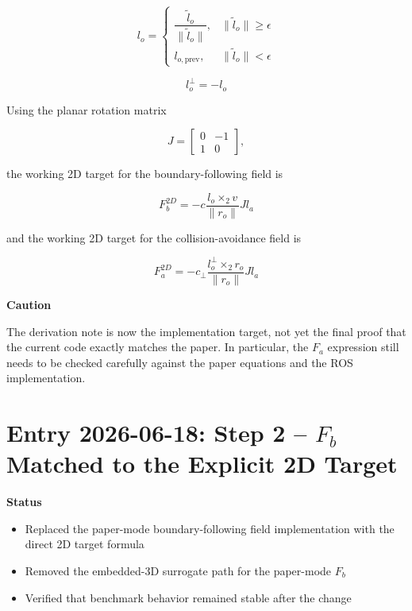 \documentclass[11pt]{article}
\begin{document}
\begin{equation}
l_o =
\begin{cases}
\dfrac{\tilde{l}_o}{\lVert \tilde{l}_o \rVert}, & \lVert \tilde{l}_o \rVert \ge \epsilon \\
l_{o,\text{prev}}, & \lVert \tilde{l}_o \rVert < \epsilon
\end{cases}
\end{equation}

\begin{equation}
l_o^\perp = -l_o
\end{equation}

Using the planar rotation matrix

\begin{equation}
J =
\begin{bmatrix}
0 & -1 \\
1 & 0
\end{bmatrix},
\end{equation}

the working 2D target for the boundary-following field is

\begin{equation}
F_b^{2D}
=
-c
\frac{l_o \times_2 v}{\lVert r_o \rVert}
J l_a
\end{equation}

and the working 2D target for the collision-avoidance field is

\begin{equation}
F_a^{2D}
=
-c_\perp
\frac{l_o^\perp \times_2 r_o}{\lVert r_o \rVert}
J l_a
\end{equation}

\textbf{Caution}

The derivation note is now the implementation target, not yet the final proof
that the current code exactly matches the paper. In particular, the \(F_a\)
expression still needs to be checked carefully against the paper equations and
the ROS implementation.

\section*{Entry 2026-06-18: Step 2 -- \(F_b\) Matched to the Explicit 2D Target}

\textbf{Status}

\begin{itemize}[leftmargin=*]
  \item Replaced the paper-mode boundary-following field implementation with the direct 2D target formula
  \item Removed the embedded-3D surrogate path for the paper-mode \(F_b\)
  \item Verified that benchmark behavior remained stable after the change
\end{itemize}
\end{document}
